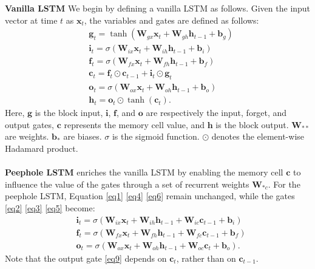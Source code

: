\documentclass[11pt]{article}
\begin{document}
\noindent \textbf{Vanilla LSTM} We begin by defining a vanilla LSTM as follows. Given the input vector at time $t$ as $\mathbf{x}_t$, the variables and gates are defined as follows:
\begin{align}
    \label{eq1} &\mathbf{g}_t = \tanh(\mathbf{W}_{gx}\mathbf{x}_t+\mathbf{W}_{gh}\mathbf{h}_{t-1} + \mathbf{b}_g)\\ 
    \label{eq2} &\mathbf{i}_t = \sigma(\mathbf{W}_{ix}\mathbf{x}_t+\mathbf{W}_{ih}\mathbf{h}_{t-1}+\mathbf{b}_i) \\
    \label{eq3} &\mathbf{f}_t = \sigma(\mathbf{W}_{fx}\mathbf{x}_t + \mathbf{W}_{fh}\mathbf{h}_{t-1} + \mathbf{b}_f)\\
    \label{eq4} &\mathbf{c}_t = \mathbf{f}_t \odot \mathbf{c}_{t-1} + \mathbf{i}_t \odot \mathbf{g}_t \\
    \label{eq5} &\mathbf{o}_t = \sigma(\mathbf{W}_{ox}\mathbf{x}_t + \mathbf{W}_{oh}\mathbf{h}_{t-1}+\mathbf{b}_o)\\
    \label{eq6} &\mathbf{h}_t = \mathbf{o}_t \odot \tanh(\mathbf{c}_t).
\end{align}
Here, $\mathbf{g}$ is the block input, $\mathbf{i}$, $\mathbf{f}$, and $\mathbf{o}$ are respectively the input, forget, and output gates, $\mathbf{c}$ represents the memory cell value, and $\mathbf{h}$ is the block output. $\mathbf{W}_{**}$ are weights. $\mathbf{b}_{*}$ are biases. $\sigma$ is the sigmoid function. $\odot$ denotes the element-wise Hadamard product. \\\\
\textbf{Peephole LSTM} enriches the vanilla LSTM by enabling the memory cell $\mathbf{c}$ to influence the value of the gates through a set of recurrent weights $\mathbf{W}_{*c}$. For the peephole LSTM, Equation \eqref{eq1} \eqref{eq4} \eqref{eq6} remain unchanged, while the gates \eqref{eq2} \eqref{eq3} \eqref{eq5} become:
\begin{align}
    \label{eq7} &\mathbf{i}_t = \sigma(\mathbf{W}_{ix}\mathbf{x}_t+\mathbf{W}_{ih}\mathbf{h}_{t-1}+\mathbf{W}_{ic}\mathbf{c}_{t-1} + \mathbf{b}_i) \\
    \label{eq8} &\mathbf{f}_t = \sigma(\mathbf{W}_{fx}\mathbf{x}_t + \mathbf{W}_{fh}\mathbf{h}_{t-1} + \mathbf{W}_{fc}\mathbf{c}_{t-1}+ \mathbf{b}_f)\\
    \label{eq9} &\mathbf{o}_t = \sigma(\mathbf{W}_{ox}\mathbf{x}_t + \mathbf{W}_{oh}\mathbf{h}_{t-1}+\mathbf{W}_{oc}\mathbf{c}_{t} + \mathbf{b}_o).
\end{align}
Note that the output gate \eqref{eq9} depends on $\mathbf{c}_t$, rather than on $\mathbf{c}_{t-1}$.\\\\
\end{document}
